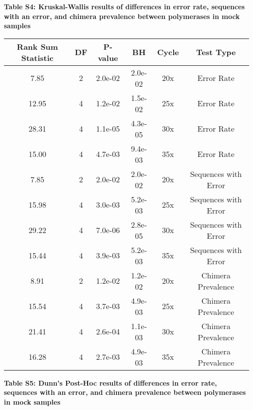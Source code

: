 \documentclass[11pt,]{article}
\begin{document}
\newpage

\textbf{Table S4: Kruskal-Wallis results of differences in error rate,
sequences with an error, and chimera prevalence between polymerases in
mock samples}

\begin{longtable}[]{@{}cccccc@{}}
\toprule
Rank Sum Statistic & DF & P-value & BH & Cycle & Test
Type\tabularnewline
\midrule
\endhead
7.85 & 2 & 2.0e-02 & 2.0e-02 & 20x & Error Rate\tabularnewline
12.95 & 4 & 1.2e-02 & 1.5e-02 & 25x & Error Rate\tabularnewline
28.31 & 4 & 1.1e-05 & 4.3e-05 & 30x & Error Rate\tabularnewline
15.00 & 4 & 4.7e-03 & 9.4e-03 & 35x & Error Rate\tabularnewline
7.85 & 2 & 2.0e-02 & 2.0e-02 & 20x & Sequences with Error\tabularnewline
15.98 & 4 & 3.0e-03 & 5.2e-03 & 25x & Sequences with
Error\tabularnewline
29.22 & 4 & 7.0e-06 & 2.8e-05 & 30x & Sequences with
Error\tabularnewline
15.44 & 4 & 3.9e-03 & 5.2e-03 & 35x & Sequences with
Error\tabularnewline
8.91 & 2 & 1.2e-02 & 1.2e-02 & 20x & Chimera Prevalence\tabularnewline
15.54 & 4 & 3.7e-03 & 4.9e-03 & 25x & Chimera Prevalence\tabularnewline
21.41 & 4 & 2.6e-04 & 1.1e-03 & 30x & Chimera Prevalence\tabularnewline
16.28 & 4 & 2.7e-03 & 4.9e-03 & 35x & Chimera Prevalence\tabularnewline
\bottomrule
\end{longtable}

\newpage

\textbf{Table S5: Dunn's Post-Hoc results of differences in error rate,
sequences with an error, and chimera prevalence between polymerases in
mock samples}
\end{document}
